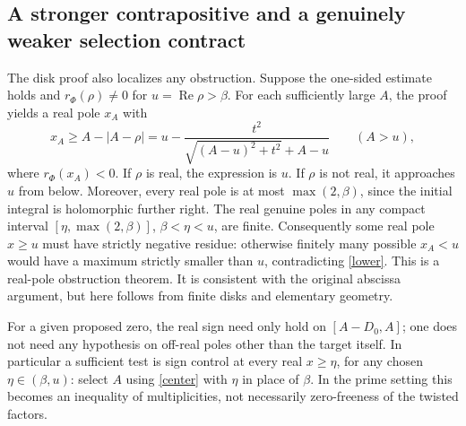 \documentclass[11pt]{article}
\theoremstyle{remark}\newtheorem{remark}[theorem]{Remark}
\newcommand{\Rea}{\operatorname{Re}}\newcommand{\abs}[1]{\left|#1\right|}
\begin{document}
\subsection{A stronger contrapositive and a genuinely weaker selection contract}
The disk proof also localizes any obstruction. Suppose the one-sided estimate holds and $r_\Phi(\rho)\ne0$ for $u=\Rea\rho>\beta$. For each sufficiently large $A$, the proof yields a real pole $x_A$ with
\begin{equation}\label{lower}
 x_A\ge A-|A-\rho|=u-\frac{t^2}{\sqrt{(A-u)^2+t^2}+A-u}\qquad(A>u),
\end{equation}
where $r_\Phi(x_A)<0$. If $\rho$ is real, the expression is $u$. If $\rho$ is not real, it approaches $u$ from below. Moreover, every real pole is at most $\max(2,\beta)$, since the initial integral is holomorphic further right. The real genuine poles in any compact interval $[\eta,\max(2,\beta)]$, $\beta<\eta<u$, are finite. Consequently some real pole $x\ge u$ must have strictly negative residue: otherwise finitely many possible $x_A<u$ would have a maximum strictly smaller than $u$, contradicting \eqref{lower}. This is a real-pole obstruction theorem. It is consistent with the original abscissa argument, but here follows from finite disks and elementary geometry.

For a given proposed zero, the real sign need only hold on $[A-D_0,A]$; one does not need any hypothesis on off-real poles other than the target itself. In particular a sufficient test is sign control at every real $x\ge\eta$, for any chosen $\eta\in(\beta,u)$: select $A$ using \eqref{center} with $\eta$ in place of $\beta$. In the prime setting this becomes an inequality of multiplicities, not necessarily zero-freeness of the twisted factors.
\end{document}
